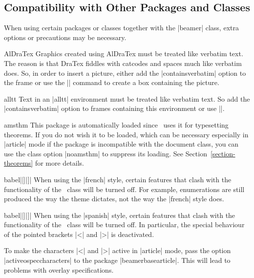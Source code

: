 
%

\subsection{Compatibility with Other Packages and Classes}

When using certain packages or classes together with the |beamer|
class, extra options or precautions may be necessary.

\begin{package}{{AlDraTex}}
  Graphics created using AlDraTex must be treated like verbatim
  text. The reason is that DraTex fiddles with catcodes and spaces
  much like verbatim does. So, in order to insert a picture, either
  add the |containsverbatim| option to the frame or use the
  || command to create a box containing the picture.
\end{package}

\begin{package}{{alltt}}
  Text in an |alltt| environment must be treated like verbatim
  text. So add the |containsverbatim| option to frames containing this
  environment or use ||.
\end{package}

\begin{package}{{amsthm}}
  This package is automatically loaded since \beamer\ uses it for
  typesetting theorems. If you do not wish it to be loaded, which can
  be necessary especially in |article| mode if the package is
  incompatible with the document class, you can use the class option
  |noamsthm| to suppress its loading. See
  Section~\ref{section-theorems} for more details.
\end{package}

\begin{package}{{babel}|[||]|}
  When using the |french| style, certain features that clash with the
  functionality of the \beamer\ class will be turned off. For example,
  enumerations are still produced the way the theme dictates, not the
  way the |french| style does.
\end{package}

\begin{package}{{babel}|[||]|}
  \beamernote
  When using the |spanish| style, certain features that clash with the
  functionality of the \beamer\ class will be turned off. In particular,
  the special behaviour of the pointed brackets |<| and |>| is
  deactivated. 

  \articlenote
  To make the characters |<| and |>| active in |article| mode, pass
  the option |activeospeccharacters| to the package
  |beamerbasearticle|. This will lead to
  problems with overlay specifications.
\end{package}

